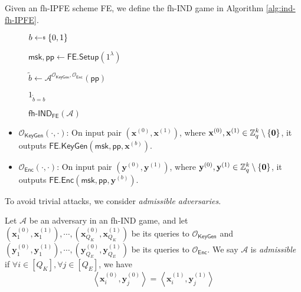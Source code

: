 Given an fh-IPFE scheme \textsf{FE}, we define the \textsf{fh-IND} game \cite{cryptoeprint:2016/440} in Algorithm \ref{alg:ind-fh-IPFE}.

\begin{figure}[h]
\centering

	\begin{minipage}[t]{0.4\textwidth}
	\begin{algorithm}[H]
	\caption{$\textsf{fh-IND}_{\textsf{FE}}(\mathcal{A})$}
	\label{alg:ind-fh-IPFE}
	\begin{algorithmic}[1]
		\State $b \getsdollar \{0, 1\}$

		\State $\textsf{msk}, \textsf{pp} \gets \textsf{FE.Setup}(1^\lambda)$

		\State $\tilde{b} \gets \mathcal{A}^{\mathcal{O}_{\textsf{KeyGen}}, \mathcal{O}_{\textsf{Enc}}} ( \textsf{pp} )$

		\State \Return $1_{\tilde{b} = b}$
	\end{algorithmic}
	\end{algorithm}
	\end{minipage}

\label{fig:ind-fh-IPFE}
\end{figure}

\begin{itemize}

	\item $\mathcal{O}_{\textsf{KeyGen}}(\cdot, \cdot)$: On input pair $(\mathbf{x}^{(0)}, \mathbf{x}^{(1)})$, where $\mathbf{x}^{(0)}, \mathbf{x}^{(1)} \in \mathbb{Z}_q^k \setminus \{\mathbf{0}\}$, it outputs $\textsf{FE.KeyGen}(\textsf{msk}, \textsf{pp}, \mathbf{x}^{(b)} )$.

	\item $\mathcal{O}_{\textsf{Enc}}(\cdot, \cdot)$: On input pair $(\mathbf{y}^{(0)}, \mathbf{y}^{(1)})$, where $\mathbf{y}^{(0)}, \mathbf{y}^{(1)} \in \mathbb{Z}_q^k \setminus \{\mathbf{0}\}$, it outputs $\textsf{FE.Enc}(\textsf{msk}, \textsf{pp}, \mathbf{y}^{(b)} )$.

\end{itemize}

\noindent To avoid trivial attacks, we consider \emph{admissible adversaries}.

\begin{definition}

	Let $\mathcal{A}$ be an adversary in an \textsf{fh-IND} game, and let $ (\mathbf{x}_1^{(0)}, \mathbf{x}_1^{(1)}), \cdots, (\mathbf{x}_{Q_K}^{(0)}, \mathbf{x}_{Q_K}^{(1)})$ be its queries to $\mathcal{O}_{\textsf{KeyGen}}$ and $(\mathbf{y}_1^{(0)}, \mathbf{y}_1^{(1)}), \cdots, (\mathbf{y}_{Q_E}^{(0)}, \mathbf{y}_{Q_E}^{(1)})$ be its queries to $\mathcal{O}_{\textsf{Enc}}$.
	We say $\mathcal{A}$ is \emph{admissible} if $\forall i \in [Q_K], \forall j \in [Q_E]$, we have
\[
	\left\langle {\mathbf{x}^{(0)}_{i}}, {\mathbf{y}^{(0)}_{j}} \right\rangle = \left\langle {\mathbf{x}^{(1)}_{i}}, {\mathbf{y}^{(1)}_{j}} \right\rangle
\]

\end{definition}


